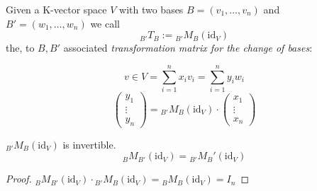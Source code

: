 \begin{definition}\label{def:bases_transmat}
   Given a K-vector space \(V\) with two bases \(B = (v_1, \ldots, v_n)\) and \(B' = (w_1, \ldots, w_n)\) we call
   \[{}_{B'}T_{B} := {}_{B'}M_{B}(\text{id}_{V})\]
   the, to \(B, B'\) associated \textit{transformation matrix for the change of bases}:

   \begin{center}
   \end{center}

   \[v \in V = \sum_{i=1}^n x_i v_i = \sum_{i=1}^n y_i w_i\]
   \[\begin{pmatrix} y_1 \\ \vdots \\ y_n \end{pmatrix} = {}_{B'}M_{B}(\text{id}_{V}) \cdot \begin{pmatrix} x_1 \\ \vdots \\ x_n \end{pmatrix}\]
\end{definition}

\begin{proposition}
   \({}_{B'}M_{B}(\text{id}_{V})\) is invertible.
   \[{}_{B}M_{B'}(\text{id}_{V}) = {}_{B'}M_{B}'(\text{id}_{V})\]
\end{proposition}
\begin{proof}
   \({}_{B}M_{B'}(\text{id}_{V}) \cdot {}_{B'}M_{B}(\text{id}_{V}) = {}_{B}M_{B}(\text{id}_{V}) = I_n\)
\end{proof}

